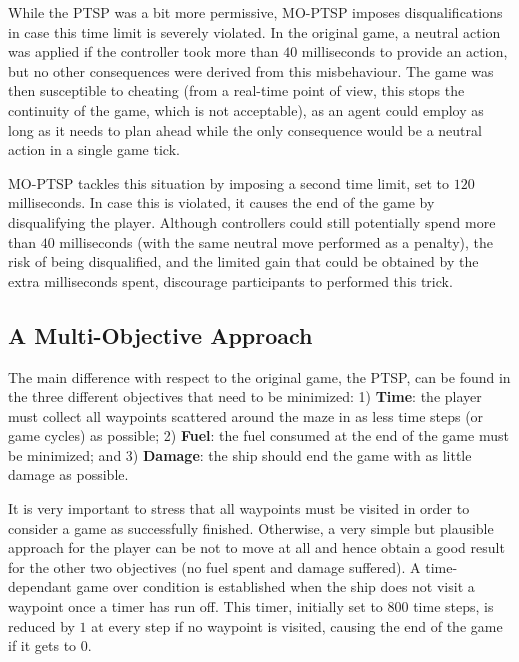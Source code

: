 \documentclass[conference]{IEEEtran}
\begin{document}
While the PTSP was a bit more permissive, MO-PTSP imposes disqualifications in case this time limit is severely violated. In the original game, a neutral action was applied if the controller took more than $40$ milliseconds to provide an action, but no other consequences were derived from this misbehaviour. The game was then susceptible to cheating (from a real-time point of view, this stops the continuity of the game, which is not acceptable), as an agent could employ as long as it needs to plan ahead while the only consequence would be a neutral action in a single game tick.  

MO-PTSP tackles this situation by imposing a second time limit, set to $120$ milliseconds. In case this is violated, it causes the end of the game by disqualifying the player. Although controllers could still potentially spend more than $40$ milliseconds (with the same neutral move performed as a penalty), the risk of being disqualified, and the limited gain that could be obtained by the extra milliseconds spent, discourage participants to performed this trick.

\subsection{A Multi-Objective Approach}

The main difference with respect to the original game, the PTSP, can be found in the three different objectives that need to be minimized: 1) \textbf{Time}: the player must collect all waypoints scattered around the maze in as less time steps (or game cycles) as possible; 2) \textbf{Fuel}: the fuel consumed at the end of the game must be minimized; and 3) \textbf{Damage}: the ship should end the game with as little damage as possible.

It is very important to stress that all waypoints must be visited in order to consider a game as successfully finished. Otherwise, a very simple but plausible approach for the player can be not to move at all and hence obtain a good result for the other two objectives (no fuel spent and damage suffered). A time-dependant game over condition is established when the ship does not visit a waypoint once a timer has run off. This timer, initially set to $800$ time steps, is reduced by $1$ at every step if no waypoint is visited, causing the end of the game if it gets to $0$.%
\end{document}

